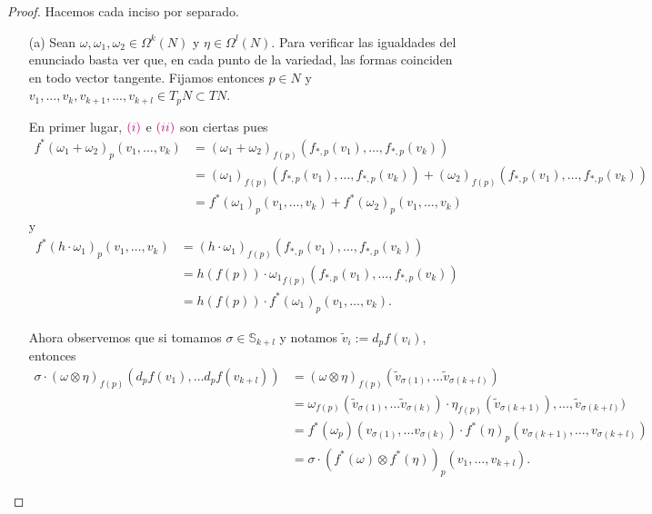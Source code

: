\documentclass[11pt]{article}
\newcommand{\Ss}{\mathbb{S}}
\newcommand{\paint}[1]{\color{color}{#1}}
\begin{document}
\begin{proof} Hacemos cada inciso por separado.
\begin{itemize}[listparindent = \parindent]
\item[(a)] Sean $\omega, \omega_1,\omega_2 \in \Omega^k(N)$ y $\eta \in \Omega^l(N)$. Para verificar las igualdades del enunciado basta ver que, en cada punto de la variedad, las formas coinciden en todo vector tangente. Fijamos entonces $p \in N$ y $v_1, \dots, v_k, v_{k+1}, \dots, v_{k+l} \in T_pN \subset TN$. 

En primer lugar, $\paint{(i)}$ e $\paint{(ii)}$ son ciertas pues
\begin{align*}
f^*(\omega_1+\omega_2)_p(v_1, \dots, v_k) &= (\omega_1+\omega_2)_{f(p)}(f_{\ast,p}(v_1), \dots, f_{\ast,p}(v_k))\\
&= ({\omega_1})_{f(p)}(f_{\ast,p}(v_1), \dots, f_{\ast,p}(v_k)) + ({\omega_2})_{f(p)}(f_{\ast,p}(v_1), \dots, f_{\ast,p}(v_k))\\
& = f^*(\omega_1)_p(v_1, \dots, v_k) + f^*(\omega_2)_p(v_1,\dots,v_k)
\end{align*}
y
\begin{align*}
f^*(h \cdot \omega_1)_p(v_1, \dots, v_k) &= (h \cdot \omega_1)_{f(p)}(f_{\ast,p}(v_1),\dots,f_{\ast,p}(v_k))\\
& = h(f(p)) \cdot {\omega_1}_{f(p)}(f_{\ast,p}(v_1),\dots,f_{\ast,p}(v_k))\\
&= h(f(p)) \cdot f^*(\omega_1)_p(v_1,\dots,v_k).
\end{align*}

Ahora observemos que si tomamos $\sigma \in \Ss_{k+l}$ y notamos $\tilde{v}_i := d_pf(v_i)$, entonces 
\begin{align*}
\sigma \cdot (\omega \otimes \eta)_{f(p)} (d_pf(v_1), \dots d_pf(v_{k+l})) &= (\omega \otimes \eta)_{f(p)} (\tilde{v}_{\sigma(1)}, \dots \tilde{v}_{\sigma(k+l)})\\
&=\omega_{f(p)} (\tilde{v}_{\sigma(1)}, \dots \tilde{v}_{\sigma(k)}) \cdot \eta_{f(p)}(\tilde{v}_{\sigma(k+1)}), \dots, \tilde{v}_{\sigma(k+l)})\\
& = f^*(\omega_p) (v_{\sigma(1)}, \dots v_{\sigma(k)}) \cdot f^*(\eta)_p(v_{\sigma(k+1)}, \dots, v_{\sigma(k+l)})\\
& = \sigma \cdot (f^*(\omega) \otimes f^*(\eta))_p(v_{1},\dots, v_{k+l}).
\end{align*}


\end{itemize}
\end{proof}
\end{document}

